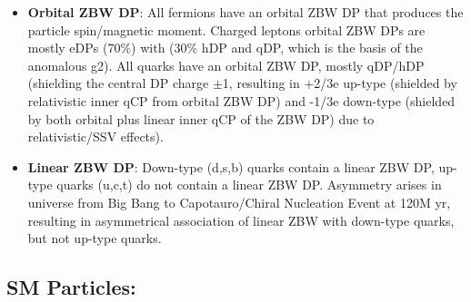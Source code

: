 \documentclass{article}
\begin{document}
\begin{itemize}
\item{\textbf{Orbital ZBW DP}}: All fermions have an orbital ZBW DP that produces the particle spin/magnetic moment. Charged leptons orbital ZBW DPs are mostly eDPs (70\%) with (30\% hDP and qDP, which is the basis of the anomalous g2). All quarks have an orbital ZBW DP, mostly qDP/hDP (shielding the central DP charge $\pm$1, resulting in +2/3e up-type (shielded by relativistic inner qCP from orbital ZBW DP) and -1/3e down-type (shielded by both orbital plus linear inner qCP of the ZBW DP) due to relativistic/SSV effects).

\item{\textbf{Linear ZBW DP}}: Down-type (d,s,b) quarks contain a linear ZBW DP, up-type quarks (u,c,t) do not contain a linear ZBW DP. Asymmetry arises in universe from Big Bang to Capotauro/Chiral Nucleation Event at 120M yr, resulting in asymmetrical association of linear ZBW with down-type quarks, but not up-type quarks.
\end{itemize}


\subsection{SM Particles:}
\end{document}
